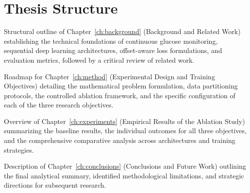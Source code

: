 \section{Thesis Structure}
\label{sec:intro:structure}

\begin{planned}
    \item Structural outline of Chapter~\ref{ch:background} (Background and Related Work) establishing the technical foundations of continuous glucose monitoring, sequential deep learning architectures, offset-aware loss formulations, and evaluation metrics, followed by a critical review of related work.
    \item Roadmap for Chapter~\ref{ch:method} (Experimental Design and Training Objectives) detailing the mathematical problem formulation, data partitioning protocols, the controlled ablation framework, and the specific configuration of each of the three research objectives.
    \item Overview of Chapter~\ref{ch:experiments} (Empirical Results of the Ablation Study) summarizing the baseline results, the individual outcomes for all three objectives, and the comprehensive comparative analysis across architectures and training strategies.
    \item Description of Chapter~\ref{ch:conclusions} (Conclusions and Future Work) outlining the final analytical summary, identified methodological limitations, and strategic directions for subsequent research.
\end{planned}